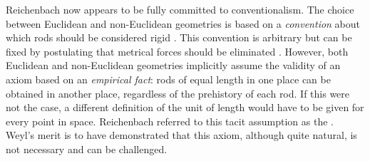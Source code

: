 \documentclass[final]{article}
\begin{document}
Reichenbach now appears to be fully committed to conventionalism. The choice between Euclidean and non-Euclidean geometries is based on a \emph{convention} about which rods should be considered rigid \citep[366]{Reichenbach1922a}. This convention is arbitrary but can be fixed by postulating that metrical forces should be eliminated \citep{Reichenbach1922}. However, both Euclidean and non-Euclidean geometries implicitly assume the validity of an axiom based on an \emph{empirical fact}: rods of equal length in one place can be obtained in another place, regardless of the prehistory of each rod. If this were not the case, a different definition of the unit of length would have to be given for every point in space. Reichenbach referred to this tacit assumption as the  \citep[366]{Reichenbach1922a}. Weyl's merit is to have demonstrated that this axiom, although quite natural, is not necessary and can be challenged.
\end{document}
